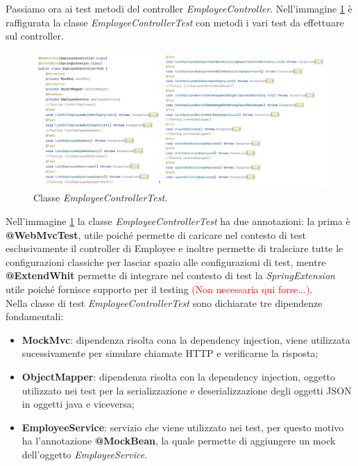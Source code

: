 \FloatBarrier
Passiamo ora ai test metodi del controller \textit{EmployeeController}. Nell'immagine \ref{employee-controller-test} è raffigurata la classe \textit{EmployeeControllerTest} con metodi i vari test da effettuare sul controller.
\FloatBarrier
\begin{figure}[!ht]
\begin{mdframed}
\centering
\includegraphics[width=1\linewidth]{immagini/EmployeeControllerTest.pdf}
\end{mdframed}
\caption{Classe \textit{EmployeeControllerTest}.}
\label{employee-controller-test}
\end{figure}
\FloatBarrier
Nell'immagine \ref{employee-controller-test} la classe \textit{EmployeeControllerTest} ha due annotazioni: la prima è \textbf{@WebMvcTest}, utile poiché permette di caricare nel contesto di test esclusivamente il controller di Employee e inoltre permette di tralsciare tutte le configurazioni classiche per lasciar spazio alle configurazioni di test, mentre \textbf{@ExtendWhit} permette di integrare nel contesto di test la \textit{SpringExtension} utile poiché fornisce supporto per il testing \textcolor{red}{(Non necessaria qui forse...)}.\\
Nella classe di test \textit{EmployeeControllerTest} sono dichiarate tre dipendenze fondamentali:
\begin{itemize}
  \item \textbf{MockMvc}: dipendenza risolta cona la dependency injection, viene utilizzata sucessivamente per simulare chiamate HTTP e verificarne la risposta;
  \item \textbf{ObjectMapper}: dipendenza risolta con la dependency injection, oggetto utilizzato nei test per la serializzazione e deserializzazione degli oggetti JSON in oggetti java e viceversa;
  \item \textbf{EmployeeService}: servizio che viene utilizzato nei test, per questo motivo ha l'annotazione \textbf{@MockBean}, la quale permette di aggiungere un mock dell'oggetto \textit{EmployeeService}.
\end{itemize}
